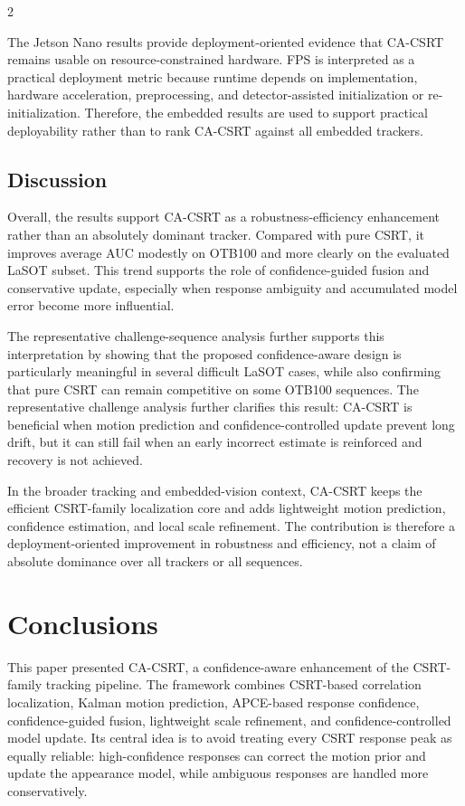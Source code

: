 \documentclass[10pt,a4paper]{article}
\begin{document}
\begin{multicols}{2}
\begin{minipage}{0.82\columnwidth}
\label{fig:jetson_embedded_results}
\end{minipage}

The Jetson Nano results provide deployment-oriented evidence that CA-CSRT remains usable on resource-constrained hardware. FPS is interpreted as a practical deployment metric because runtime depends on implementation, hardware acceleration, preprocessing, and detector-assisted initialization or re-initialization. Therefore, the embedded results are used to support practical deployability rather than to rank CA-CSRT against all embedded trackers.

\subsection{Discussion}

Overall, the results support CA-CSRT as a robustness-efficiency enhancement rather than an absolutely dominant tracker. Compared with pure CSRT, it improves average AUC modestly on OTB100 and more clearly on the evaluated LaSOT subset. This trend supports the role of confidence-guided fusion and conservative update, especially when response ambiguity and accumulated model error become more influential.

The representative challenge-sequence analysis further supports this interpretation by showing that the proposed confidence-aware design is particularly meaningful in several difficult LaSOT cases, while also confirming that pure CSRT can remain competitive on some OTB100 sequences. The representative challenge analysis further clarifies this result: CA-CSRT is beneficial when motion prediction and confidence-controlled update prevent long drift, but it can still fail when an early incorrect estimate is reinforced and recovery is not achieved.

In the broader tracking and embedded-vision context, CA-CSRT keeps the efficient CSRT-family localization core and adds lightweight motion prediction, confidence estimation, and local scale refinement. The contribution is therefore a deployment-oriented improvement in robustness and efficiency, not a claim of absolute dominance over all trackers or all sequences.

\section{Conclusions}

This paper presented CA-CSRT, a confidence-aware enhancement of the CSRT-family tracking pipeline. The framework combines CSRT-based correlation localization, Kalman motion prediction, APCE-based response confidence, confidence-guided fusion, lightweight scale refinement, and confidence-controlled model update. Its central idea is to avoid treating every CSRT response peak as equally reliable: high-confidence responses can correct the motion prior and update the appearance model, while ambiguous responses are handled more conservatively.


\end{multicols}
\end{document}
